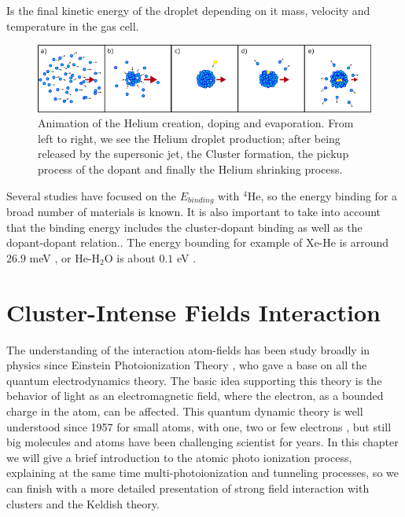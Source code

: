 Is the final kinetic energy of the droplet depending on it mass, velocity and temperature in the gas cell.


\begin{figure}[h!]

\centering
\includegraphics[width=14cm]{../Images/He_evaporation (2).png}
\caption[Helium creation, doping and evaporation sketch]{Animation of the Helium creation, doping and evaporation. From left to right, we see the Helium droplet production; after being released by the supersonic jet, the Cluster formation, the pickup process of the dopant and finally the Helium shrinking process.}
\label{fig:shrink}
\end{figure}

Several studies have focused on the $E_{binding}$ with $^{4}$He,  so the energy binding  for a broad number of materials is known. It is also important to take into account that the binding energy includes the cluster-dopant binding as well as the dopant-dopant relation.\cite{toennies_spectroscopy_1998}. The energy bounding for example of Xe-He is arround $26.9 $ meV \cite{lewerenz_successive_1995}, or He-H$_{2}$O is about $0.1$ eV \cite{lewis_Helium_2014}.

\section{Cluster-Intense Fields  Interaction}


The understanding of the interaction atom-fields has been study broadly in physics since Einstein Photoionization Theory \cite{einstein_uber_1905}, who gave a base on all the quantum electrodynamics theory. The basic idea supporting  this theory is the behavior of light as an electromagnetic field, where the electron, as a bounded charge in the atom, can be affected.  This quantum dynamic theory is well understood since 1957 for small atoms, with one, two or few electrons \cite{a._bethe_quantum_1957}, but still big molecules and atoms have been challenging scientist for years. In this chapter we will give a brief introduction to the atomic photo ionization process, explaining at the same time multi-photoionization and tunneling processes, so we can finish with a more detailed presentation of strong field interaction with clusters and the Keldish theory.

